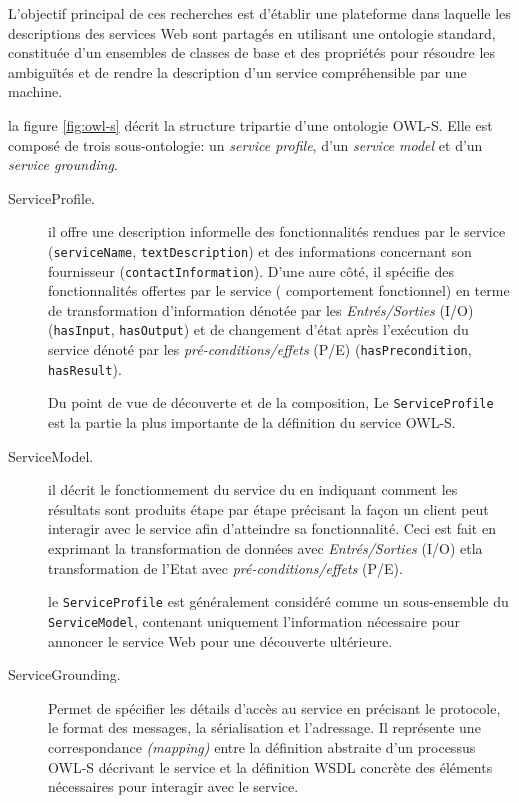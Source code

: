     L'objectif principal de ces recherches est d'établir une
    plateforme dans laquelle les descriptions des services Web sont
    partagés en utilisant une ontologie standard, constituée d'un
    ensembles de classes de base et des propriétés pour résoudre les
    ambiguïtés et de rendre la description d'un service compréhensible
    par une machine.\newpage

    la figure \ref{fig:owl-s} décrit la structure tripartie d'une
    ontologie \textsc{OWL-S}. Elle est composé de trois
    sous-ontologie: un \emph{service profile}, d'un \emph{service
      model} et d'un \emph{service grounding}.

    \SpecialItem
    \begin{description}
    \item[ServiceProfile.] il offre une description informelle des
      fonctionnalités rendues par le service (\verb|serviceName|,
      \verb|textDescription|) et des informations concernant son
      fournisseur (\verb|contactInformation|). D'une aure côté, il
      spécifie des fonctionnalités offertes par le service (
      comportement fonctionnel) en terme de transformation
      d'information dénotée par les \textit{Entrés/Sorties}
      \textsc{(I/O)} (\verb|hasInput|, \verb|hasOutput|) et de
      changement d'état après l'exécution du service dénoté par les
      \textit{pré-conditions/effets} \textsc{(P/E)}
      (\verb|hasPrecondition|, \verb|hasResult|).

      Du point de vue de découverte et de la composition, Le
      \verb|ServiceProfile| est la partie la plus importante de la
      définition du service \textsc{OWL-S}.

    \item[ServiceModel.] il décrit le fonctionnement du service du en
      indiquant comment les résultats sont produits étape par étape
      précisant la façon un client peut interagir avec le service afin
      d'atteindre sa fonctionnalité. Ceci est fait en exprimant la
      transformation de données avec \textit{Entrés/Sorties}
      \textsc{(I/O)} etla transformation de l'Etat avec
      \textit{pré-conditions/effets} \textsc{(P/E)}.

      le \verb|ServiceProfile| est généralement considéré comme un
      sous-ensemble du \verb|ServiceModel|, contenant uniquement
      l'information nécessaire pour annoncer le service Web pour une
      découverte ultérieure.

    \item[ServiceGrounding.] Permet de spécifier les détails d'accès
      au service en précisant le protocole, le format des messages, la
      sérialisation et l'adressage. Il représente une correspondance
      \textit{(mapping)} entre la définition abstraite d'un processus
      \textsc{OWL-S} décrivant le service et la définition
      \textsc{WSDL} concrète des éléments nécessaires pour interagir
      avec le service.


\end{description}
